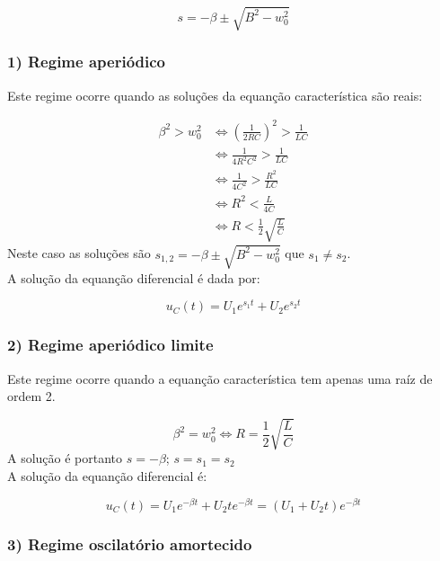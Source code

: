 \begin{equation}
    s = -\beta \pm \sqrt{B^2 - w_0^2}
\end{equation}

\subsubsection*{1) Regime aperiódico}

Este regime ocorre quando as soluções da equanção característica são reais:

\begin{equation}
  \begin{aligned}
    \beta^2 > w_0^2 &\Leftrightarrow (\frac{1}{2RC})^2 > \frac{1}{LC} \\
    & \Leftrightarrow \frac{1}{4R^2C^2} > \frac{1}{LC} \\
    & \Leftrightarrow \frac{1}{4C^2} > \frac{R^2}{LC} \\
    & \Leftrightarrow R^2 < \frac{L}{4C} \\
    & \Leftrightarrow R < \frac{1}{2} \sqrt{\frac{L}{C}}
  \end{aligned}
\end{equation}
Neste caso as soluções são $s_{1,2} = -\beta \pm \sqrt{B^2 - w_0^2}$ que $s_1 \neq s_2$.
\\A solução da equanção diferencial é dada por:

\begin{equation}
  u_C(t) = U_1 e^{s_1t} + U_2 e^{s_2t}
\end{equation}

\subsubsection*{2) Regime aperiódico limite}

Este regime ocorre quando a equanção característica tem apenas uma raíz de ordem 2.

\begin{equation}
  \beta^2 = w_0^2 \Leftrightarrow R = \frac{1}{2} \sqrt{\frac{L}{C}}
\end{equation}
A solução é portanto $s = -\beta$; $s = s_1 = s_2$
\\A solução da equanção diferencial é:

\begin{equation}
  u_C(t) = U_1 e^{-\beta t} + U_2 t e^{-\beta t} = (U_1 + U_2 t ) e^{-\beta t}
\end{equation}

\subsubsection*{3) Regime oscilatório amortecido}

